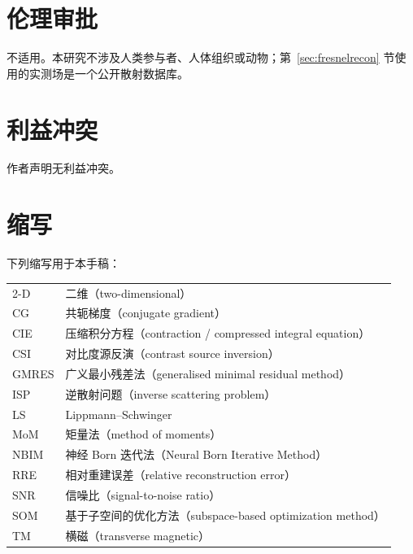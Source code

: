 \documentclass[UTF8,a4paper,11pt]{ctexart}
\begin{document}
\section*{伦理审批}
不适用。本研究不涉及人类参与者、人体组织或动物；第~\ref{sec:fresnelrecon} 节使用的实测场是一个公开散射数据库。

\section*{利益冲突}
作者声明无利益冲突。

\clearpage
\section*{缩写}
下列缩写用于本手稿：
\begin{center}
\footnotesize
\begin{tabular}{@{}ll@{}}
2-D & 二维（two-dimensional）\\
CG & 共轭梯度（conjugate gradient）\\
CIE & 压缩积分方程（contraction / compressed integral equation）\\
CSI & 对比度源反演（contrast source inversion）\\
GMRES & 广义最小残差法（generalised minimal residual method）\\
ISP & 逆散射问题（inverse scattering problem）\\
LS & Lippmann--Schwinger\\
MoM & 矩量法（method of moments）\\
NBIM & 神经 Born 迭代法（Neural Born Iterative Method）\\
RRE & 相对重建误差（relative reconstruction error）\\
SNR & 信噪比（signal-to-noise ratio）\\
SOM & 基于子空间的优化方法（subspace-based optimization method）\\
TM & 横磁（transverse magnetic）
\end{tabular}
\end{center}
\end{document}
